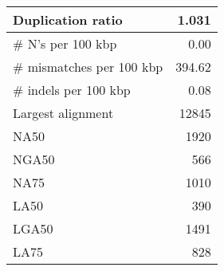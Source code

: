 \documentclass[12pt,a4paper]{article}
\begin{document}
\begin{table}[ht]
\begin{center}
\begin{tabular}{|l*{1}{|r}|}
Duplication ratio & 1.031 \\ \hline
\# N's per 100 kbp & 0.00 \\ \hline
\# mismatches per 100 kbp & 394.62 \\ \hline
\# indels per 100 kbp & 0.08 \\ \hline
Largest alignment & 12845 \\ \hline
NA50 & 1920 \\ \hline
NGA50 & 566 \\ \hline
NA75 & 1010 \\ \hline
LA50 & 390 \\ \hline
LGA50 & 1491 \\ \hline
LA75 & 828 \\ \hline
\end{tabular}
\end{center}
\end{table}
\end{document}

